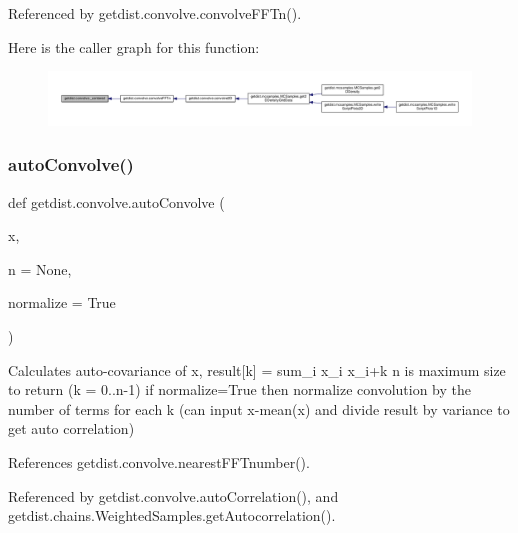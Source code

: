 Referenced by getdist.\+convolve.\+convolve\+F\+F\+Tn().

Here is the caller graph for this function\+:
\nopagebreak
\begin{figure}[H]
\begin{center}
\leavevmode
\includegraphics[width=350pt]{namespacegetdist_1_1convolve_adf879b81d1cce2e9098c8feca4b9d85b_icgraph}
\end{center}
\end{figure}
\mbox{\label{namespacegetdist_1_1convolve_af6628a68c41ddfddec7944d891a31800}} 
\subsubsection{\texorpdfstring{auto\+Convolve()}{autoConvolve()}}
{\footnotesize\ttfamily def getdist.\+convolve.\+auto\+Convolve (\begin{DoxyParamCaption}\item[{}]{x,  }\item[{}]{n = {\ttfamily None},  }\item[{}]{normalize = {\ttfamily True} }\end{DoxyParamCaption})}

\begin{DoxyVerb}Calculates auto-covariance of x, result[k] = sum_i x_i x_{i+k}
n is maximum size to return (k = 0..n-1)
if normalize=True then normalize convolution by the number of terms for each k
(can input x-mean(x) and divide result by variance to get auto correlation)
\end{DoxyVerb}
 

References getdist.\+convolve.\+nearest\+F\+F\+Tnumber().



Referenced by getdist.\+convolve.\+auto\+Correlation(), and getdist.\+chains.\+Weighted\+Samples.\+get\+Autocorrelation().

